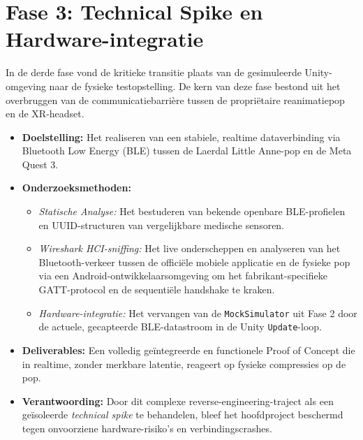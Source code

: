 \section{Fase 3: Technical Spike en Hardware-integratie}
In de derde fase vond de kritieke transitie plaats van de gesimuleerde Unity-omgeving naar de fysieke testopstelling. 
De kern van deze fase bestond uit het overbruggen van de communicatiebarrière tussen de propriëtaire reanimatiepop en de XR-headset.
\begin{itemize}
    \item \textbf{Doelstelling:} Het realiseren van een stabiele, realtime dataverbinding via Bluetooth Low Energy (BLE) tussen de Laerdal Little 
    Anne-pop en de Meta Quest 3.
    \item \textbf{Onderzoeksmethoden:} 
        \begin{itemize}
            \item \textit{Statische Analyse:} Het bestuderen van bekende openbare BLE-profielen en UUID-structuren van vergelijkbare medische sensoren.
            \item \textit{Wireshark HCI-sniffing:} Het live onderscheppen en analyseren van het Bluetooth-verkeer tussen de officiële mobiele applicatie en de 
            fysieke pop via een Android-ontwikkelaarsomgeving om het fabrikant-specifieke GATT-protocol en de sequentiële handshake te kraken.
            \item \textit{Hardware-integratie:} Het vervangen van de \texttt{MockSimulator} uit Fase 2 door de actuele, gecapteerde BLE-datastroom in de Unity 
            \texttt{Update}-loop.
        \end{itemize}
    \item \textbf{Deliverables:} Een volledig geïntegreerde en functionele Proof of Concept die in realtime, zonder merkbare latentie, reageert op fysieke 
    compressies op de pop.
    \item \textbf{Verantwoording:} Door dit complexe reverse-engineering-traject als een geïsoleerde \textit{technical spike} te behandelen, bleef het hoofdproject 
    beschermd tegen onvoorziene hardware-risiko's en verbindingscrashes.
\end{itemize}

